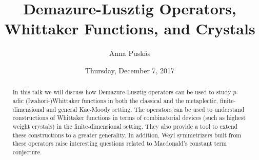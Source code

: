 \documentclass{UAmathtalk}
\author{Anna Puskás}
\title{Demazure-Lusztig Operators,\\ Whittaker Functions, and Crystals}
\date{Thursday, December 7, 2017}
\begin{document}
\maketitle

\begin{abstract}
In this talk we will discuss how Demazure-Lusztig operators can be used to study $p$-adic (Iwahori-)Whittaker functions in both the classical and the metaplectic, finite-dimensional and general Kac-Moody setting. The operators can be used to understand constructions of Whittaker functions in terms of combinatorial devices (such as highest weight crystals) in the finite-dimensional setting. They also provide a tool to extend these constructions to a greater generality. In addition, Weyl symmetrizers built from these operators raise interesting questions related to Macdonald's constant term conjecture.
\end{abstract}
\end{document}
